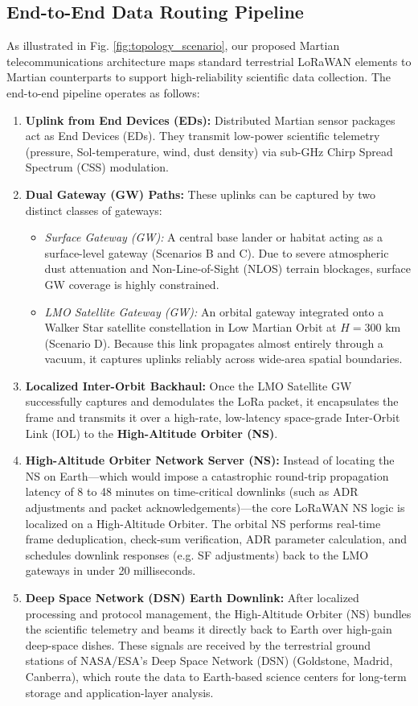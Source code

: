 \documentclass[journal,10pt,doublecolumn]{IEEEtran}
\begin{document}
\subsection{End-to-End Data Routing Pipeline}
As illustrated in Fig. \ref{fig:topology_scenario}, our proposed Martian telecommunications architecture maps standard terrestrial LoRaWAN elements to Martian counterparts to support high-reliability scientific data collection. The end-to-end pipeline operates as follows:
\begin{enumerate}
    \item \textbf{Uplink from End Devices (EDs):} Distributed Martian sensor packages act as End Devices (EDs). They transmit low-power scientific telemetry (pressure, Sol-temperature, wind, dust density) via sub-GHz Chirp Spread Spectrum (CSS) modulation. 
    \item \textbf{Dual Gateway (GW) Paths:} These uplinks can be captured by two distinct classes of gateways:
    \begin{itemize}
        \item \textit{Surface Gateway (GW):} A central base lander or habitat acting as a surface-level gateway (Scenarios B and C). Due to severe atmospheric dust attenuation and Non-Line-of-Sight (NLOS) terrain blockages, surface GW coverage is highly constrained.
        \item \textit{LMO Satellite Gateway (GW):} An orbital gateway integrated onto a Walker Star satellite constellation in Low Martian Orbit at $H = 300\text{ km}$ (Scenario D). Because this link propagates almost entirely through a vacuum, it captures uplinks reliably across wide-area spatial boundaries.
    \end{itemize}
    \item \textbf{Localized Inter-Orbit Backhaul:} Once the LMO Satellite GW successfully captures and demodulates the LoRa packet, it encapsulates the frame and transmits it over a high-rate, low-latency space-grade Inter-Orbit Link (IOL) to the \textbf{High-Altitude Orbiter (NS)}. 
    \item \textbf{High-Altitude Orbiter Network Server (NS):} Instead of locating the NS on Earth—which would impose a catastrophic round-trip propagation latency of 8 to 48 minutes on time-critical downlinks (such as ADR adjustments and packet acknowledgements)—the core LoRaWAN NS logic is localized on a High-Altitude Orbiter. The orbital NS performs real-time frame deduplication, check-sum verification, ADR parameter calculation, and schedules downlink responses (e.g. SF adjustments) back to the LMO gateways in under 20 milliseconds.
    \item \textbf{Deep Space Network (DSN) Earth Downlink:} After localized processing and protocol management, the High-Altitude Orbiter (NS) bundles the scientific telemetry and beams it directly back to Earth over high-gain deep-space dishes. These signals are received by the terrestrial ground stations of NASA/ESA's Deep Space Network (DSN) (Goldstone, Madrid, Canberra), which route the data to Earth-based science centers for long-term storage and application-layer analysis.
\end{enumerate}
\end{document}
